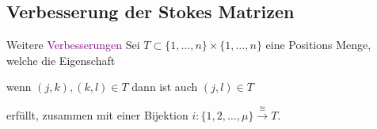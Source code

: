 \subsection{Verbesserung der Stokes Matrizen}
\begin{frame}{Weitere \textcolor{purple}{Verbesserungen}}
  Sei $T\subset\{1,\dots,n\}\times\{1,\dots,n\}$ eine Positions Menge, welche
  die Eigenschaft
  \begin{einr}
    wenn $(j,k),(k,l)\in T$ dann ist auch $(j,l)\in T$
  \end{einr}
  erfüllt, zusammen mit einer Bijektion
  $i:\{1,2,\dots,\mu\}\overset{\cong}{\to}T$.
\end{frame}

